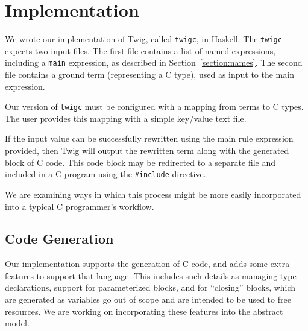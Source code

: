 
\section{Implementation}

We wrote our implementation of Twig, called \texttt{twigc}, in
Haskell. The \texttt{twigc} expects two input files. The first
file contains a list of named expressions, including a
\texttt{main} expression, as described in
Section~\ref{section:names}. The second file contains a ground
term (representing a C type), used as input to the main
expression.

Our version of \texttt{twigc} must be configured with a mapping
from terms to C types. The user provides this mapping with a
simple key/value text file.

If the input value can be successfully rewritten using the main
rule expression provided, then Twig will output the rewritten term
along with the generated block of C code. This code block may be
redirected to a separate file and included in a C program using
the \texttt{\#include} directive.

We are examining ways in which this process might be more easily
incorporated into a typical C programmer's workflow.

\subsection{Code Generation}

Our implementation supports the generation of C code, and adds
some extra features to support that language. This includes such
details as managing type declarations, support for parameterized
blocks, and for ``closing'' blocks, which are generated as
variables go out of scope and are intended to be used to free
resources. We are working on incorporating these features into the
abstract model.
